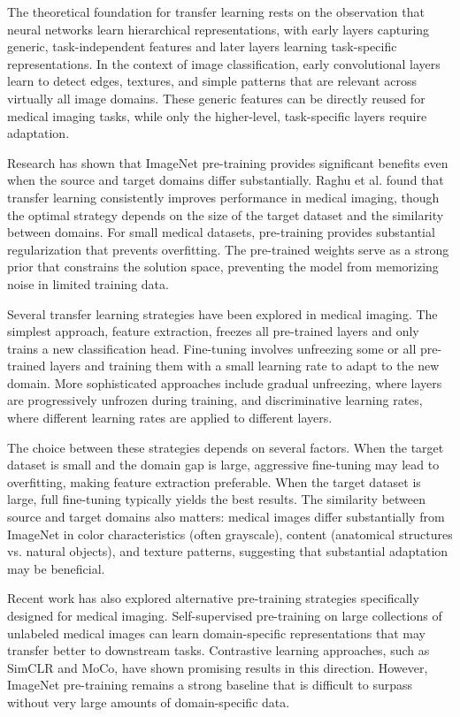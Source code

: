 \documentclass[12pt,a4paper]{article}
\begin{document}
The theoretical foundation for transfer learning rests on the observation that neural networks learn hierarchical representations, with early layers capturing generic, task-independent features and later layers learning task-specific representations. In the context of image classification, early convolutional layers learn to detect edges, textures, and simple patterns that are relevant across virtually all image domains. These generic features can be directly reused for medical imaging tasks, while only the higher-level, task-specific layers require adaptation.

Research has shown that ImageNet pre-training provides significant benefits even when the source and target domains differ substantially. Raghu et al. \cite{raghu2019} found that transfer learning consistently improves performance in medical imaging, though the optimal strategy depends on the size of the target dataset and the similarity between domains. For small medical datasets, pre-training provides substantial regularization that prevents overfitting. The pre-trained weights serve as a strong prior that constrains the solution space, preventing the model from memorizing noise in limited training data.

Several transfer learning strategies have been explored in medical imaging. The simplest approach, feature extraction, freezes all pre-trained layers and only trains a new classification head. Fine-tuning involves unfreezing some or all pre-trained layers and training them with a small learning rate to adapt to the new domain. More sophisticated approaches include gradual unfreezing, where layers are progressively unfrozen during training, and discriminative learning rates, where different learning rates are applied to different layers.

The choice between these strategies depends on several factors. When the target dataset is small and the domain gap is large, aggressive fine-tuning may lead to overfitting, making feature extraction preferable. When the target dataset is large, full fine-tuning typically yields the best results. The similarity between source and target domains also matters: medical images differ substantially from ImageNet in color characteristics (often grayscale), content (anatomical structures vs. natural objects), and texture patterns, suggesting that substantial adaptation may be beneficial.

Recent work has also explored alternative pre-training strategies specifically designed for medical imaging. Self-supervised pre-training on large collections of unlabeled medical images can learn domain-specific representations that may transfer better to downstream tasks. Contrastive learning approaches, such as SimCLR and MoCo, have shown promising results in this direction. However, ImageNet pre-training remains a strong baseline that is difficult to surpass without very large amounts of domain-specific data.
\end{document}

